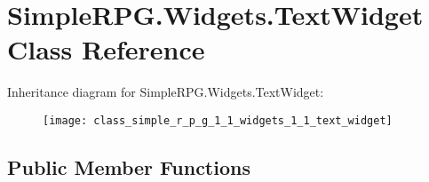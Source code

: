 \hypertarget{class_simple_r_p_g_1_1_widgets_1_1_text_widget}{\section{Simple\-R\-P\-G.\-Widgets.\-Text\-Widget Class Reference}
\label{class_simple_r_p_g_1_1_widgets_1_1_text_widget}
}
Inheritance diagram for Simple\-R\-P\-G.\-Widgets.\-Text\-Widget\-:\begin{figure}[H]
\begin{center}
\leavevmode
\texttt{[image: class\_simple\_r\_p\_g\_1\_1\_widgets\_1\_1\_text\_widget]}
\end{center}
\end{figure}
\subsection*{Public Member Functions}
